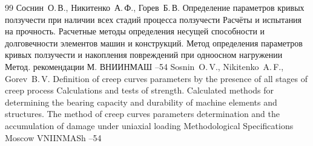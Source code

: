 \begin{thebibliography}{99}
\by Соснин~О.\,В., Никитенко~А.\,Ф., Горев~Б.\,В. 
\paper Определение параметров кривых ползучести при наличии всех стадий процесса ползучести 
\inbook Расчёты и испытания на прочность. Расчетные методы определения несущей способности и долговечности элементов машин и конструкций. Метод определения параметров кривых ползучести и накопления повреждений при одноосном нагружении
\bookinfo Метод. рекомендации
\publaddr М.
\publ ВНИИНМАШ
--54
\misctransl
\by Sosnin~O.\,V., Nikitenko~A.\,F., Gorev~B.\,V.
\paper Definition of creep curves parameters  by the presence of all stages of creep process
\inbook  Calculations and tests of strength. Calculated methods for determining the bearing capacity and durability of machine elements and structures. The method of creep curves parameters determination   and the accumulation of damage under uniaxial loading
\bookinfo Methodological Specifications
\publaddr Moscow
\publ VNIINMASh 
--54

\end{thebibliography}

\noindent
\hskip6.5cm \thedate \par\noindent
\hskip6.5cm\therevdate





\makeengtitlem



 \newpage
%
%
%
